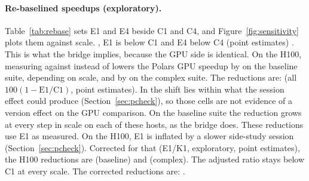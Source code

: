 \documentclass[11pt]{article}
\begin{document}
\paragraph{Re-baselined speedups (exploratory).}
Table~\ref{tab:rebase} sets E1 and E4 beside C1 and C4, and
Figure~\ref{fig:sensitivity} plots them against scale. , E1 is below C1 and E4 below C4 (point estimates)
. This is what the
bridge implies, because the GPU side is identical. On the H100, measuring
against \polarsnew{} instead of \polarsold{} lowers the Polars GPU speedup by
 on the
baseline suite, depending on scale, and by
 on the complex
suite. The reductions are: 
(all $100(1-\mathrm{E1}/\mathrm{C1})$, point estimates). In
 the shift lies within what the session
effect could produce (Section~\ref{sec:pcheck}), so those cells are not
evidence of a version effect on the GPU comparison. On the baseline suite
the reduction grows at every step in scale on each of these hosts, as the bridge
does.
\ifpcheck
These reductions use E1 as measured. On the H100, E1 is inflated by a slower
side-study session (Section~\ref{sec:pcheck}). Corrected for that
(E1/K1, exploratory, point estimates), the H100 reductions are  (baseline)
and  (complex). The adjusted ratio stays below C1 at every scale.
The corrected reductions are:
.
\fi
\end{document}
